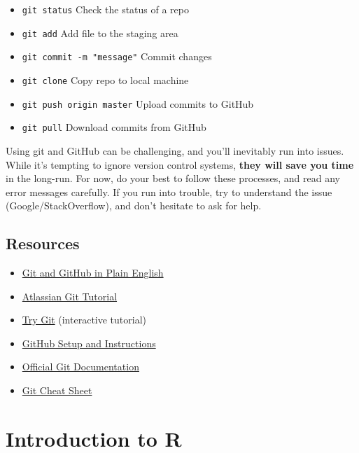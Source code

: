 \documentclass[]{book}
\providecommand{\tightlist}{%
  \setlength{\itemsep}{0pt}\setlength{\parskip}{0pt}}
\theoremstyle{definition}
\theoremstyle{definition}
\theoremstyle{remark}
\begin{document}
\begin{itemize}
\tightlist
\item
  \texttt{git\ status} Check the status of a repo
\item
  \texttt{git\ add} Add file to the staging area
\item
  \texttt{git\ commit\ -m\ "message"} Commit changes
\item
  \texttt{git\ clone} Copy repo to local machine
\item
  \texttt{git\ push\ origin\ master} Upload commits to GitHub
\item
  \texttt{git\ pull} Download commits from GitHub
\end{itemize}

Using git and GitHub can be challenging, and you'll inevitably run into
issues. While it's tempting to ignore version control systems,
\textbf{they will save you time} in the long-run. For now, do your best
to follow these processes, and read any error messages carefully. If you
run into trouble, try to understand the issue (Google/StackOverflow),
and don't hesitate to ask for help.

\section*{Resources}\label{resources-3}


\begin{itemize}
\tightlist
\item
  \href{https://red-badger.com/blog/2016/11/29/gitgithub-in-plain-english}{Git
  and GitHub in Plain English}
\item
  \href{https://www.atlassian.com/git/tutorials/what-is-version-control}{Atlassian
  Git Tutorial}
\item
  \href{https://try.github.io/levels/1/challenges/1}{Try Git}
  (interactive tutorial)
\item
  \href{https://help.github.com/articles/set-up-git/}{GitHub Setup and
  Instructions}
\item
  \href{https://git-scm.com/doc}{Official Git Documentation}
\item
  \href{https://education.github.com/git-cheat-sheet-education.pdf}{Git
  Cheat Sheet}
\end{itemize}

\hypertarget{r-intro}{\chapter{Introduction to R}\label{r-intro}}
\end{document}
